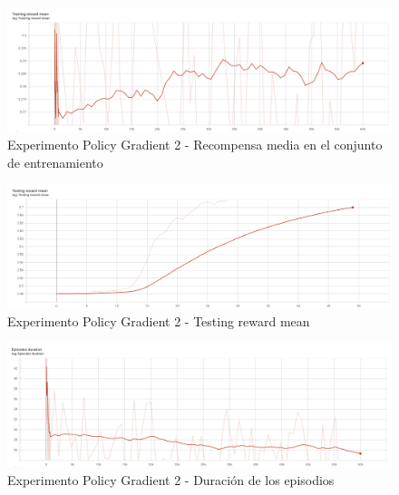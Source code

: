 \begin{figure}[H]
	\centering
	\includegraphics[width=1\textwidth]{figuras/experiments/policy_gradient/policy_gradient_normalized_image_reward_50_epochs/training_reward_mean.png}
	\caption[Experimento Policy Gradient 2 - Recompensa media en el conjunto de entrenamiento]{Experimento Policy Gradient 2 - Recompensa media en el conjunto de entrenamiento}
	\label{fig-experimento-policy-gradient-2-training-reward-mean}
\end{figure}
\begin{figure}[H]
	\centering
	\includegraphics[width=1\textwidth]{figuras/experiments/policy_gradient/policy_gradient_normalized_image_reward_50_epochs/testing_reward_mean.png}
	\caption[Experimento Policy Gradient 2 - Testing reward mean]{Experimento Policy Gradient 2 - Testing reward mean}
	\label{fig-experimento-policy-gradient-2-testing-reward-mean}
\end{figure}
\begin{figure}[H]
	\centering
	\includegraphics[width=1\textwidth]{figuras/experiments/policy_gradient/policy_gradient_normalized_image_reward_50_epochs/episodes_duration.png}
	\caption[Experimento Policy Gradient 2 - Duración de los episodios]{Experimento Policy Gradient 2 - Duración de los episodios}
	\label{fig-experimento-policy-gradient-2-episodes-duration}
\end{figure}

